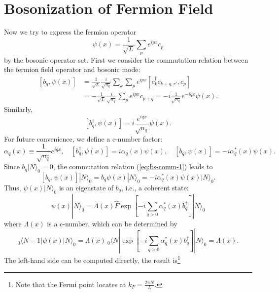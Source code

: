 \documentclass[aps,prb,superscriptaddress,nofootinbib]{revtex4}
\begin{document}
\section{Bosonization of Fermion Field}
Now we try to express the fermion operator 
\begin{equation}
	\psi(x) = \frac{1}{\sqrt{L}} \sum_p e^{ipx} c_{p}
\end{equation}
by the bosonic operator set.
First we consider the commutation relation between the fermion field operator and bosonic mode:
\begin{equation}\label{eq:bs-comm-1}
\begin{aligned}
	\left[b_q,\psi(x)\right] &= \frac{1}{\sqrt L}\frac{i}{\sqrt{n_q}}\sum_{k}\sum_{p} e^{ipx} [c^\dagger_{k}c_{k+q,r'},c_{p}] \\
	&= -\frac{1}{\sqrt L} \frac{i}{\sqrt{n_q}} \sum_{p} e^{ipx} c_{p+q} 
	= -i\frac{1}{\sqrt{n_q}} e^{-iqx} \psi(x).
\end{aligned}
\end{equation}
Similarly,
\begin{equation}\label{eq:bs-comm-2}
	\left[b_q^\dagger,\psi(x)\right] = i\frac{e^{iqx}}{\sqrt{n_q}} \psi(x).
\end{equation}
For future convenience, we define a c-number factor:
\begin{equation}
	\alpha_q(x) \equiv \frac{1}{\sqrt{n_q}} e^{iqx},\quad
	[b_q^\dagger,\psi(x)] = i\alpha_q(x) \psi(x),\quad
	[b_q,\psi(x)] = -i \alpha^*_q(x) \psi(x).
\end{equation}
Since $b_q|N\rangle_0 = 0$, the commutation relation (\ref{eq:bs-comm-1}) leads to
\begin{equation}
	\left[b_{q}, \psi(x)\right]|N\rangle_{0} 
	=b_{q} \psi(x)|N\rangle_{0} 
	= -i\alpha_q^*(x) \psi(x)|N\rangle_{0}.
\end{equation}
Thus, $\psi(x)|N\rangle_0$ is an eigenstate of $b_q$, i.e., a coherent state:
\begin{equation}
	\psi(x)|N\rangle_0 
	= \Lambda(x) \hat F \exp\left[-i\sum_{q>0} \alpha_q^*(x) b_q^\dagger\right]|N\rangle_0
\end{equation}
where $\Lambda(x)$ is a c-number, which can be determined by
\begin{equation*}
	{}_{0}\langle N-1|\psi(x)| N\rangle_{0}=\Lambda(x)\ {}_{0}\langle N|\exp \left[-i\sum_{q>0} \alpha^*_q(x) b_{q}^{\dagger}\right]| N\rangle_{0} = \Lambda(x).
\end{equation*}
The left-hand side can be computed directly, the result is\footnote{Note that the Fermi point locates at $k_F=\frac{2\pi N}{L}$.}
\end{document}
